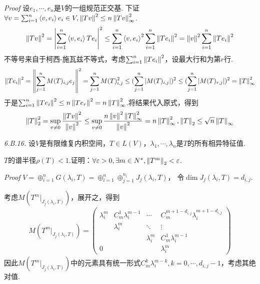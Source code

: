 \textit{Proof}
设\(e_1,\cdots,e_n\)是\(V\)的一组规范正交基.
下证\(\forall v=\sum_{i=1}^n \left\langle v,e_i \right\rangle e_i \in V,\left\lVert Tv \right\rVert^2 \leq n \left\lVert Tv \right\rVert_{\infty}^2\).
    \begin{align*}
        \left\lVert Tv \right\rVert^2=\left\lvert \sum_{i=1}^n \left\langle v,e_i \right\rangle Te_i \right\rvert^2 \leq \sum_{i=1}^n \left\langle v,e_i \right\rangle^2 \sum_{i=1}^n \left\lVert Te_i \right\rVert^2 
        =\left\lVert v \right\rVert^2 \sum_{i=1}^n \left\lVert Te_i \right\rVert^2
    \end{align*}
不等号来自于柯西-施瓦兹不等式，考虑\(\sum_{i=1}^n \left\lVert Te_i \right\rVert^2\)，设最大行和为第\(r\)行.
    \begin{align*}
        \left\lVert Te_i \right\rVert^2=\left\lVert \sum_{j=1}^n M(T)_{i,j}e_j \right\rVert^2=\sum_{j=1}^n M(T)_{i,j}^2
        \leq (\sum_{j=1}^n \left\lvert M(T)_{i,j} \right\rvert)^2 \leq (\sum_{j=1}^n \left\lvert M(T)_{r,j} \right\rvert)^2=\left\lVert T \right\rVert_{\infty}^2
    \end{align*}
于是\(\sum_{i=1}^n \left\lVert Te_i \right\rVert^2 \leq n\left\lVert Te_r \right\rVert^2=n\left\lVert T \right\rVert_{\infty}^2\).将结果代入原式，得到
    \begin{align*}
        \left\lVert T \right\rVert_2^2=\sup_{v \ne 0} \dfrac{\left\lVert Tv \right\rVert^2}{\left\lVert v \right\rVert^2} 
        \leq \sup_{v \ne 0} \dfrac{n \left\lVert v \right\rVert^2 \left\lVert T \right\rVert_{\infty}^2}{\left\lVert v \right\rVert^2}=n \left\lVert T \right\rVert_{\infty}^2,
        \left\lVert T \right\rVert_2 \leq \sqrt{n}\left\lVert T \right\rVert_{\infty}
    \end{align*}

\newpage

\textit{6.B.16.}
设\(V\)是有限维复内积空间，\(T \in L(V)\)，\(\lambda_1,\cdots,\lambda_n\)是\(T\)的所有相异特征值.

\(T\)的谱半径\(\rho(T)<1\).证明：\(\forall \varepsilon>0,\exists m \in N^*,\left\lVert T^m \right\rVert_2<\varepsilon\).

\textit{Proof}
\(V=\oplus_{i=1}^n G(\lambda_i,T)=\oplus_{i=1}^n\oplus_{j=1}^{n_i} J_j(\lambda_i,T)\)，
令\(\dim J_j(\lambda_i,T)=d_{i,j}\).

考虑\(M(T^m|_{J_j(\lambda_i,T)})\)，展开之，得到
    \begin{align*}
        M(T^m|_{J_j(\lambda_i,T)})=
        \begin{pmatrix}
            \lambda_i^m & C_m^1 \lambda_i^{m-1} & \cdots      & C_m^{m+1-d_{i,j}} \lambda_i^{m+1-d_{i,j}} \\
                        & \lambda_i^m           & \ddots      & \vdots                                    \\
                        &                       & \lambda_i^m & C_m^1 \lambda_i^{m-1}                     \\
                 0      &                       &             & \lambda_i^m
        \end{pmatrix}
    \end{align*}
因此\(M(T^m|_{J_j(\lambda_i,T)})\)中的元素具有统一形式\(C_m^k \lambda_i^{m-k},k=0,\cdots,d_{i,j}-1\)，考虑其绝对值.

